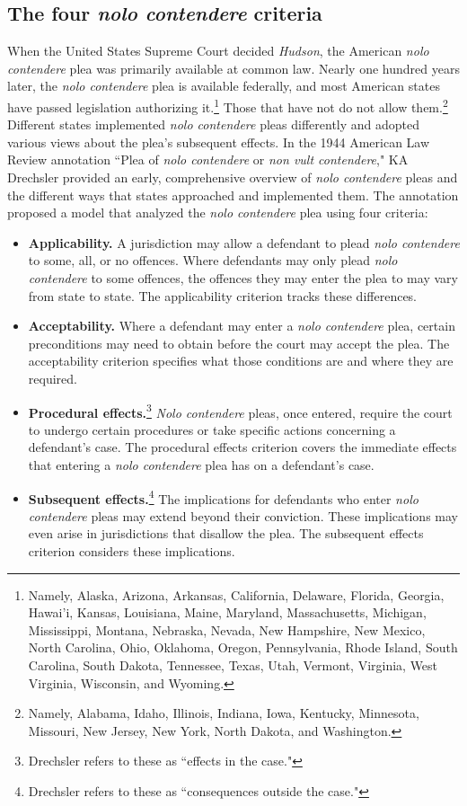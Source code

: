 \subsection{The four \textit{nolo contendere} criteria}

When the United States Supreme Court decided \textit{Hudson}, the American \textit{nolo contendere} plea was primarily available at common law. Nearly one hundred years later, the \textit{nolo contendere} plea is available federally, and most American states have passed legislation authorizing it.\footnote{Namely, Alaska, Arizona, Arkansas, California, Delaware, Florida, Georgia, Hawai'i, Kansas, Louisiana, Maine, Maryland, Massachusetts, Michigan, Mississippi, Montana, Nebraska, Nevada, New Hampshire, New Mexico, North Carolina, Ohio, Oklahoma, Oregon, Pennsylvania, Rhode Island, South Carolina, South Dakota, Tennessee, Texas, Utah, Vermont, Virginia, West Virginia, Wisconsin, and Wyoming.}  Those that have not do not allow them.\footnote{Namely, Alabama, Idaho, Illinois, Indiana, Iowa, Kentucky, Minnesota, Missouri, New Jersey, New York, North Dakota, and Washington.} Different states implemented \textit{nolo contendere} pleas differently and adopted various views about the plea's subsequent effects. In the 1944 American Law Review annotation ``Plea of \textit{nolo contendere} or \textit{non vult contendere}," KA Drechsler provided an early, comprehensive overview of \textit{nolo contendere} pleas and the different ways that states approached and implemented them. The annotation proposed a model that analyzed the \textit{nolo contendere} plea using four criteria:

\begin{itemize}
    \item \textbf{Applicability.} A jurisdiction may allow a defendant to plead \textit{nolo contendere} to some, all, or no offences. Where defendants may only plead \textit{nolo contendere} to some offences, the offences they may enter the plea to may vary from state to state. The applicability criterion tracks these differences.
    \item \textbf{Acceptability.} Where a defendant may enter a \textit{nolo contendere} plea, certain preconditions may need to obtain before the court may accept the plea. The acceptability criterion specifies what those conditions are and where they are required.
    \item \textbf{Procedural effects.}\footnote{Drechsler refers to these as ``effects in the case."} \textit{Nolo contendere} pleas, once entered, require the court to undergo certain procedures or take specific actions concerning a defendant's case. The procedural effects criterion covers the immediate effects that entering a \textit{nolo contendere} plea has on a defendant's case.
    \item \textbf{Subsequent effects.}\footnote{Drechsler refers to these as ``consequences outside the case."} The implications for defendants who enter \textit{nolo contendere} pleas may extend beyond their conviction. These implications may even arise in jurisdictions that disallow the plea. The subsequent effects criterion considers these implications.
\end{itemize}

